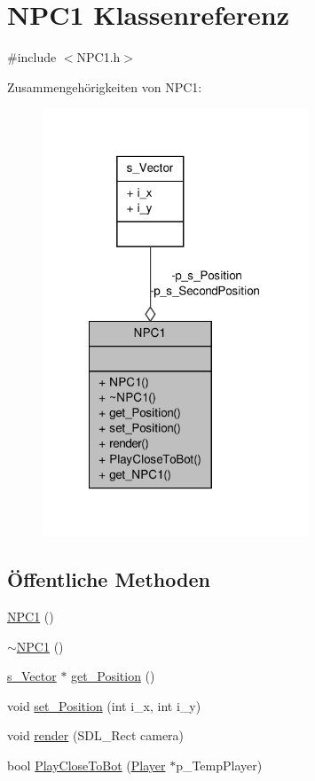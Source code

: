 \hypertarget{class_n_p_c1}{\section{N\-P\-C1 Klassenreferenz}
\label{class_n_p_c1}
}


{\ttfamily \#include $<$N\-P\-C1.\-h$>$}



Zusammengehörigkeiten von N\-P\-C1\-:
\nopagebreak
\begin{figure}[H]
\begin{center}
\leavevmode
\includegraphics[width=224pt]{class_n_p_c1__coll__graph}
\end{center}
\end{figure}
\subsection*{Öffentliche Methoden}
\begin{DoxyCompactItemize}
\item 
\hyperlink{class_n_p_c1_ad76416c9a95fb9a774976297c8593595}{N\-P\-C1} ()
\item 
\hyperlink{class_n_p_c1_ab204b325bcd16659c66a491c9b10e8e2}{$\sim$\-N\-P\-C1} ()
\item 
\hyperlink{structs___vector}{s\-\_\-\-Vector} $\ast$ \hyperlink{class_n_p_c1_aa76eead3904b61145d210ee5d077fab9}{get\-\_\-\-Position} ()
\item 
void \hyperlink{class_n_p_c1_a6f7d2842c3ad04969ed90722324875b4}{set\-\_\-\-Position} (int i\-\_\-x, int i\-\_\-y)
\item 
void \hyperlink{class_n_p_c1_a3fa4f42017cbef90df3fc010de47f452}{render} (S\-D\-L\-\_\-\-Rect camera)
\item 
bool \hyperlink{class_n_p_c1_a630634825b51471ec57664e03f8f69c1}{Play\-Close\-To\-Bot} (\hyperlink{class_player}{Player} $\ast$p\-\_\-\-Temp\-Player)
\end{DoxyCompactItemize}
